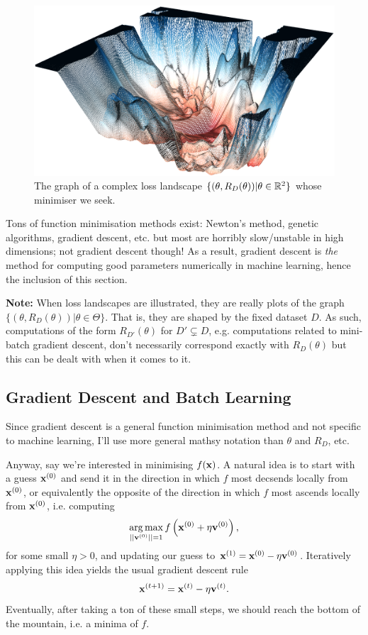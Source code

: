 \documentclass[11pt]{article}
\begin{document}
\begin{figure}[ht]
    \centering
    \includegraphics[width=0.75\columnwidth]{./figures/gradient_descent/loss_landscape.png}
    \caption{The graph of a complex loss landscape $\{(\theta,R_D(\theta))|\theta\in\mathbb{R}^2\}$ whose minimiser we seek.}
    \label{fig:loss_landscape_complex}
\end{figure}

Tons of function minimisation methods exist: Newton's method, genetic algorithms, gradient descent, etc. but most are horribly slow/unstable in high dimensions; not gradient descent though! As a result, gradient descent is \textit{the} method for computing good parameters numerically in machine learning, hence the inclusion of this section.

\vspace{10pt}
\noindent\textbf{Note:} When loss landscapes are illustrated, they are really plots of the graph $\{(\theta, R_D(\theta))|\theta\in\Theta\}$. That is, they are shaped by the fixed dataset $D$. As such, computations of the form $R_{D'}(\theta)$ for $D'\subsetneq D$, e.g. computations related to mini-batch gradient descent, don't necessarily correspond exactly with $R_D(\theta)$ but this can be dealt with when it comes to it.

\subsection{Gradient Descent and Batch Learning}
Since gradient descent is a general function minimisation method and not specific to machine learning, I'll use more general mathsy notation than $\theta$ and $R_D$, etc.

Anyway, say we're interested in minimising $f(\mathbf{x})$. A natural idea is to start with a guess $\mathbf{x}^{(0)}$ and send it in the direction in which $f$ most decsends locally from $\mathbf{x}^{(0)}$, or equivalently the opposite of the direction in which $f$ most ascends locally from $\mathbf{x}^{(0)}$, i.e. computing
$$
\operatorname*{arg\,max}_{||\mathbf{v}^{(0)}||=1}f\left(\mathbf{x}^{(0)}+\eta\mathbf{v}^{(0)}\right),
$$
for some small $\eta>0$, and updating our guess to $\mathbf{x}^{(1)}=\mathbf{x}^{(0)}-\eta\mathbf{v}^{(0)}$. Iteratively applying this idea yields the usual gradient descent rule
$$
\mathbf{x}^{(t+1)}
=
\mathbf{x}^{(t)}-\eta\mathbf{v}^{(t)}.
$$
Eventually, after taking a ton of these small steps, we should reach the bottom of the mountain, i.e. a minima of $f$.
\end{document}

